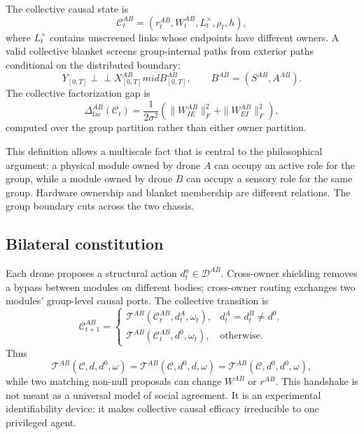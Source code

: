 \documentclass[11pt,a4paper]{article}
\numberwithin{equation}{section}
\newcommand{\indep}{\perp\!\!\!\perp}
\newcommand{\Corg}{\mathcal{C}}
\newcommand{\Tmap}{\mathcal{T}}
\newcommand{\Gap}{\Delta_{\mathrm{fac}}}
\begin{document}
The collective causal state is
\begin{equation}
 \Corg_t^{AB}=(r_t^{AB},W_t^{AB},L_t^{\times},\rho_t,h),
 \label{eq:group-causal-state}
\end{equation}
where $L_t^{\times}$ contains unscreened links whose endpoints have different
owners. A valid collective blanket screens group-internal paths from exterior
paths conditional on the distributed boundary:
\begin{equation}
 Y_{[0,T]}\indep X^{AB}_{[0,T]}mid
 B^{AB}_{[0,T]},\qquad B^{AB}=(S^{AB},A^{AB}).
 \label{eq:group-factorization}
\end{equation}
The collective factorization gap is
\begin{equation}
 \Gap^{AB}(\Corg_t)=\frac{1}{2\sigma^2}
 \left(\|W^{AB}_{IE}\|_F^2+\|W^{AB}_{EI}\|_F^2\right),
 \label{eq:group-gap}
\end{equation}
computed over the group partition rather than either owner partition.

This definition allows a multiscale fact that is central to the philosophical
argument: a physical module owned by drone $A$ can occupy an active role for
the group, while a module owned by drone $B$ can occupy a sensory role for the
same group. Hardware ownership and blanket membership are different
relations. The group boundary cuts across the two chassis.

\subsection{Bilateral constitution}

Each drone proposes a structural action $d_t^a\in\mathcal D^{AB}$.
Cross-owner shielding removes a bypass between modules on different bodies;
cross-owner routing exchanges two modules' group-level causal ports. The
collective transition is
\begin{equation}
 \Corg_{t+1}^{AB}=
 \begin{cases}
  \Tmap^{AB}(\Corg_t^{AB},d_t^A,\omega_t),
  & d_t^A=d_t^B\neq d^0,\\
  \Tmap^{AB}(\Corg_t^{AB},d^0,\omega_t),&\text{otherwise.}
 \end{cases}
 \label{eq:handshake}
\end{equation}
Thus
\begin{equation}
 \Tmap^{AB}(\Corg,d,d^0,\omega)
 =\Tmap^{AB}(\Corg,d^0,d,\omega)
 =\Tmap^{AB}(\Corg,d^0,d^0,\omega),
 \label{eq:no-unilateral-effect}
\end{equation}
while two matching non-null proposals can change $W^{AB}$ or $r^{AB}$. This
handshake is not meant as a universal model of social agreement. It is an
experimental identifiability device: it makes collective causal efficacy
irreducible to one privileged agent.
\end{document}
